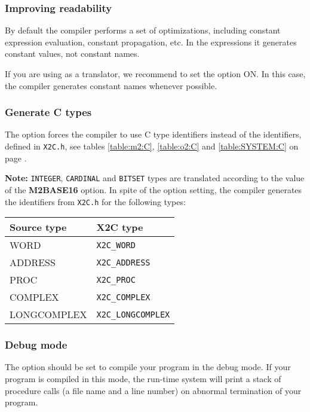 \subsubsection{Improving readability}

By default the compiler performs a set of optimizations, including
constant expression evaluation, constant propagation, etc.
In the expressions it generates constant values, not constant names.

If you are using \XDS{} as a translator, we recommend to set the option
 ON. In this case, the
compiler generates constant names whenever possible.

\subsubsection{Generate C types}

The     option
forces the compiler  to  use  C  type  identifiers instead of the identifiers,
defined  in  {\tt  X2C.h}, see tables \ref{table:m2:C}, \ref{table:o2:C}
and \ref{table:SYSTEM:C}\ifonline\else{} on page \pageref{table:m2:C}\fi.

{\bf Note:}
\mt{}  {\tt  INTEGER},  {\tt CARDINAL} and {\tt BITSET} types are
translated according to the value of the {\bf M2BASE16} option.
In spite of the option setting, the compiler generates the identifiers
from {\tt X2C.h} for the following types:
\begin{center}
\begin{tabular}{|l|l|} \hline
\bf Source type & \bf X2C type   \\ \hline
WORD            & \verb+X2C_WORD+              \\
ADDRESS         & \verb+X2C_ADDRESS+           \\
PROC            & \verb+X2C_PROC+              \\
COMPLEX         & \verb+X2C_COMPLEX+           \\
LONGCOMPLEX     & \verb+X2C_LONGCOMPLEX+       \\
\hline
\end{tabular}
\end{center}

\subsubsection{Debug mode}

The  option should be set
to compile your program in the debug mode. If your program is compiled
in this mode, the run-time system will print a stack of procedure calls
(a file name and a line number) on abnormal termination of your program.

